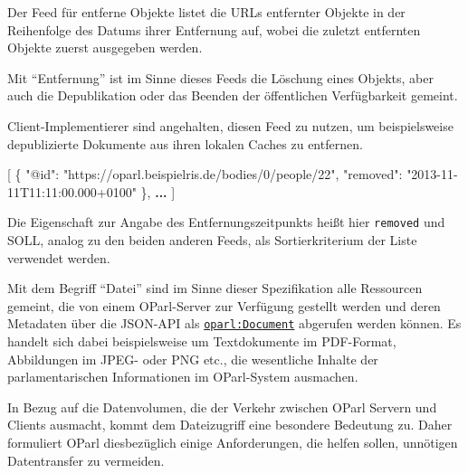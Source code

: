 \documentclass[,a4paper]{article}
\newenvironment{Shaded}{}{}
\newcommand{\DataTypeTok}[1]{\textcolor[rgb]{0.56,0.13,0.00}{{#1}}}
\newcommand{\StringTok}[1]{\textcolor[rgb]{0.25,0.44,0.63}{{#1}}}
\newcommand{\OtherTok}[1]{\textcolor[rgb]{0.00,0.44,0.13}{{#1}}}
\newcommand{\FunctionTok}[1]{\textcolor[rgb]{0.02,0.16,0.49}{{#1}}}
\newcommand{\ErrorTok}[1]{\textcolor[rgb]{1.00,0.00,0.00}{\textbf{{#1}}}}
\begin{document}

Der Feed für entferne Objekte listet die URLs entfernter Objekte in der
Reihenfolge des Datums ihrer Entfernung auf, wobei die zuletzt
entfernten Objekte zuerst ausgegeben werden.

Mit ``Entfernung'' ist im Sinne dieses Feeds die Löschung eines Objekts,
aber auch die Depublikation oder das Beenden der öffentlichen
Verfügbarkeit gemeint.

Client-Implementierer sind angehalten, diesen Feed zu nutzen, um
beispielsweise depublizierte Dokumente aus ihren lokalen Caches zu
entfernen.

\begin{Shaded}
\begin{Highlighting}[]
\OtherTok{[}
    \FunctionTok{\{}
        \DataTypeTok{"@id"}\FunctionTok{:} \StringTok{"https://oparl.beispielris.de/bodies/0/people/22"}\FunctionTok{,}
        \DataTypeTok{"removed"}\FunctionTok{:} \StringTok{"2013-11-11T11:11:00.000+0100"}
    \FunctionTok{\}}\OtherTok{,}
    \ErrorTok{...}
\OtherTok{]}
\end{Highlighting}
\end{Shaded}

Die Eigenschaft zur Angabe des Entfernungszeitpunkts heißt hier
\texttt{removed} und SOLL, analog zu den beiden anderen Feeds, als
Sortierkriterium der Liste verwendet werden.


Mit dem Begriff ``Datei'' sind im Sinne dieser Spezifikation alle
Ressourcen gemeint, die von einem OParl-Server zur Verfügung gestellt
werden und deren Metadaten über die JSON-API als
\hyperref[oparlux5fdocument]{\texttt{oparl:Document}} abgerufen werden
können. Es handelt sich dabei beispielsweise um Textdokumente im
PDF-Format, Abbildungen im JPEG- oder PNG etc., die wesentliche Inhalte
der parlamentarischen Informationen im OParl-System ausmachen.

In Bezug auf die Datenvolumen, die der Verkehr zwischen OParl Servern
und Clients ausmacht, kommt dem Dateizugriff eine besondere Bedeutung
zu. Daher formuliert OParl diesbezüglich einige Anforderungen, die
helfen sollen, unnötigen Datentransfer zu vermeiden.
\end{document}
